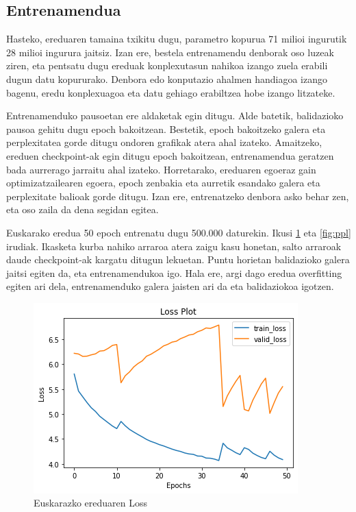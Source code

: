 \documentclass[11pt,a4paper]{article}
\begin{document}
\subsection{Entrenamendua}

Hasteko, ereduaren tamaina txikitu dugu, parametro kopurua 71 milioi ingurutik 28 milioi ingurura jaitsiz. Izan ere, bestela entrenamendu denborak oso luzeak ziren, eta pentsatu dugu ereduak konplexutasun nahikoa izango zuela erabili dugun datu kopururako. Denbora edo konputazio ahalmen handiagoa izango bagenu, eredu konplexuagoa eta datu gehiago erabiltzea hobe izango litzateke.

Entrenamenduko pausoetan ere aldaketak egin ditugu. Alde batetik, balidazioko pausoa gehitu dugu epoch bakoitzean. Bestetik, epoch bakoitzeko galera eta perplexitatea gorde ditugu ondoren grafikak atera ahal izateko. Amaitzeko, ereduen checkpoint-ak egin ditugu epoch bakoitzean, entrenamendua geratzen bada aurrerago jarraitu ahal izateko. Horretarako, ereduaren egoeraz gain optimizatzailearen egoera, epoch zenbakia eta aurretik esandako galera eta perplexitate balioak gorde ditugu. Izan ere, entrenatzeko denbora asko behar zen, eta oso zaila da dena segidan egitea.

Euskarako eredua 50 epoch entrenatu dugu 500.000 daturekin. Ikusi \ref{fig:loss} eta \ref{fig:ppl} irudiak. Ikasketa kurba nahiko arraroa atera zaigu kasu honetan, salto arraroak daude checkpoint-ak kargatu ditugun lekuetan. Puntu horietan balidazioko galera jaitsi egiten da, eta entrenamendukoa igo. Hala ere, argi dago eredua overfitting egiten ari dela, entrenamenduko galera jaisten ari da eta balidaziokoa igotzen.

\begin{figure}[ht]
    \centering
    \includegraphics[width=\linewidth]{loss}
    \caption{Euskarazko ereduaren Loss}
    \label{fig:loss}
\end{figure}
\end{document}
